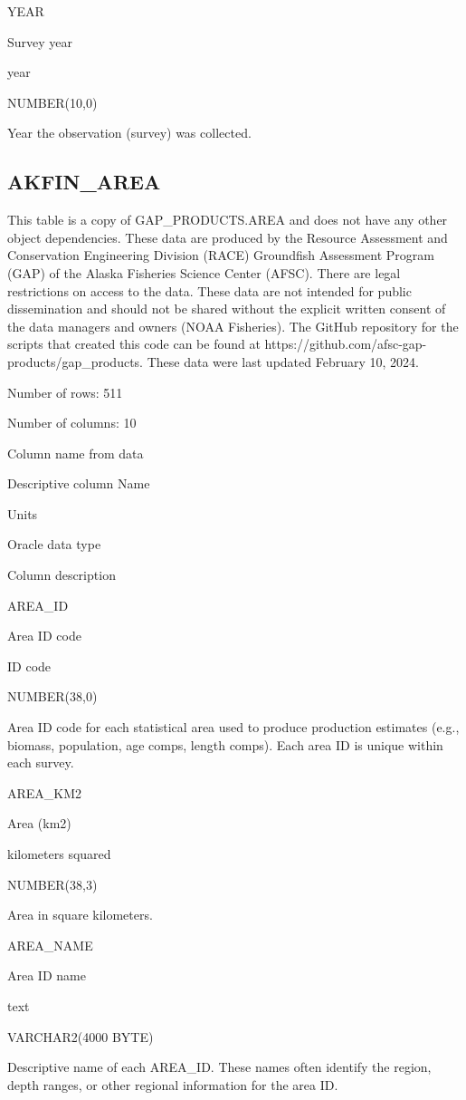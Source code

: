 \documentclass[
  letterpaper,
  oneside,
  open=any]{scrbook}
\begin{document}
YEAR

Survey year

year

NUMBER(10,0)

Year the observation (survey) was collected.

\hypertarget{akfin_area}{%
\subsection{AKFIN\_AREA}\label{akfin_area}}

This table is a copy of GAP\_PRODUCTS.AREA and does not have any other
object dependencies. These data are produced by the Resource Assessment
and Conservation Engineering Division (RACE) Groundfish Assessment
Program (GAP) of the Alaska Fisheries Science Center (AFSC). There are
legal restrictions on access to the data. These data are not intended
for public dissemination and should not be shared without the explicit
written consent of the data managers and owners (NOAA Fisheries). The
GitHub repository for the scripts that created this code can be found at
https://github.com/afsc-gap-products/gap\_products. These data were last
updated February 10, 2024.

Number of rows: 511

Number of columns: 10

Column name from data

Descriptive column Name

Units

Oracle data type

Column description

AREA\_ID

Area ID code

ID code

NUMBER(38,0)

Area ID code for each statistical area used to produce production
estimates (e.g., biomass, population, age comps, length comps). Each
area ID is unique within each survey.

AREA\_KM2

Area (km2)

kilometers squared

NUMBER(38,3)

Area in square kilometers.

AREA\_NAME

Area ID name

text

VARCHAR2(4000 BYTE)

Descriptive name of each AREA\_ID. These names often identify the
region, depth ranges, or other regional information for the area ID.
\end{document}
